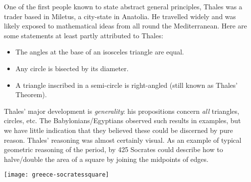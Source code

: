
One of the first people known to state abstract general principles, Thales was a trader based in Miletus, a city-state in Anatolia. He travelled widely and was likely exposed to mathematical ideas from all round the Mediterranean. Here are some statements at least partly attributed to Thales:\vspace{-3pt}
\begin{itemize}\itemsep0pt
  \item The angles at the base of an isosceles triangle are equal.
  \item Any circle is bisected by its diameter.
  \item A triangle inscribed in a semi-circle is right-angled (still known as Thales' Theorem).
\end{itemize}

\begin{minipage}[t]{0.79\linewidth}\vspace{-10pt}
	Thales' major development is \emph{generality}: his propositions concern \emph{all} triangles, circles, etc. The Babylonians/Egyptians observed such results in examples, but we have little indication that they believed these could be discerned by pure reason. Thales' reasoning was almost certainly visual. As an example of typical geometric reasoning of the period, by 425\BC{} Socrates could describe how to halve/double the area of a square by joining the midpoints of edges.
\end{minipage}
\hfill
\begin{minipage}[t]{0.2\linewidth}\vspace{-8pt}
  \flushright
  \texttt{[image: greece-socratessquare]}
\end{minipage}
\vspace{-5pt}




